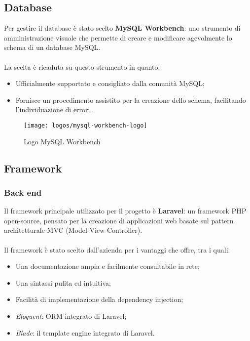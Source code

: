 \subsection{Database}
Per gestire il database è stato scelto \textbf{MySQL Workbench}: uno strumento di amministrazione visuale che permette di creare e modificare agevolmente lo schema di un database MySQL.
\\ \\
La scelta è ricaduta su questo strumento in quanto: 
\begin{itemize}
	\item Ufficialmente supportato e consigliato dalla comunità MySQL;
	\item Fornisce un procedimento assistito per la creazione dello schema, facilitando l'individuazione di errori.
\end{itemize}

\begin{figure}[htbp]
\begin{center}
\texttt{[image: logos/mysql-workbench-logo]}
\caption{Logo MySQL Workbench}
\end{center}
\end{figure}

\subsection{Framework}
\subsubsection{Back end}
Il framework principale utilizzato per il progetto è \textbf{Laravel}: un framework PHP open-source, pensato per la creazione di applicazioni web basate sul pattern architetturale MVC (Model-View-Controller). 
\\ \\
Il framework è stato scelto dall'azienda per i vantaggi che offre, tra i quali:
\begin{itemize}
	\item Una documentazione ampia e facilmente consultabile in rete;
	\item Una sintassi pulita ed intuitiva;
	\item Facilità di implementazione della dependency injection;
	\item \textit{Eloquent}: ORM integrato di Laravel;
	\item \textit{Blade}: il template engine integrato di Laravel.
\end{itemize}

